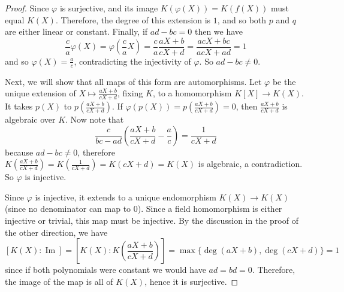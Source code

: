 \documentclass[10pt]{article}
\DeclareMathOperator*{\im}{Im}
\begin{document}
\begin{enumerate}
\begin{proof}
Since $\varphi$ is surjective, and its image $K(\varphi(X)) = K(f(X))$ must equal $K(X)$.  Therefore, the degree of this extension is $1$, and so both $p$ and $q$ are either linear or constant.  Finally, if $ad - bc = 0$ then we have
$$
\frac{c}{a}\varphi(X) = \varphi(\frac{c}{a}X) = \frac{c}{a}\frac{aX+b}{cX+d} = \frac{acX+bc}{acX+ad} = 1
$$
and so $\varphi(X) = \frac{a}{c}$, contradicting the injectivity of $\varphi$.  So $ad-bc \neq 0$.

Next, we will show that all maps of this form are automorphisms.  Let $\varphi$ be the unique extension of $X \mapsto \frac{aX+b}{cX+d}$, fixing $K$, to a homomorphism $K[X] \rightarrow K(X)$.  It takes $p(X)$ to $p(\frac{aX+b}{cX+d})$.  If $\varphi(p(X)) = p(\frac{aX+b}{cX+d}) = 0$, then $\frac{aX+b}{cX+d}$ is algebraic over $K$.  Now note that
$$
\frac{c}{bc-ad}\left(\frac{aX+b}{cX+d} - \frac{a}{c}\right) = \frac{1}{cX+d}
$$
because $ad - bc \neq 0$, therefore $K(\frac{aX+b}{cX+d}) = K(\frac{1}{cX+d}) = K(cX+d) = K(X)$ is algebraic, a contradiction.  So $\varphi$ is injective.

Since $\varphi$ is injective, it extends to a unique endomorphism $K(X) \rightarrow K(X)$ (since no denominator can map to $0$).  Since a field homomorphism is either injective or trivial, this map must be injective.  By the discussion in the proof of the other direction, we have
$$
[K(X):\im] = [K(X):K(\frac{aX+b}{cX+d})] = \max\{\deg(aX+b),\deg(cX+d)\} = 1
$$
since if both polynomials were constant we would have $ad = bd = 0$.  Therefore, the image of the map is all of $K(X)$, hence it is surjective.


\end{proof}
\end{enumerate}
\end{document}
